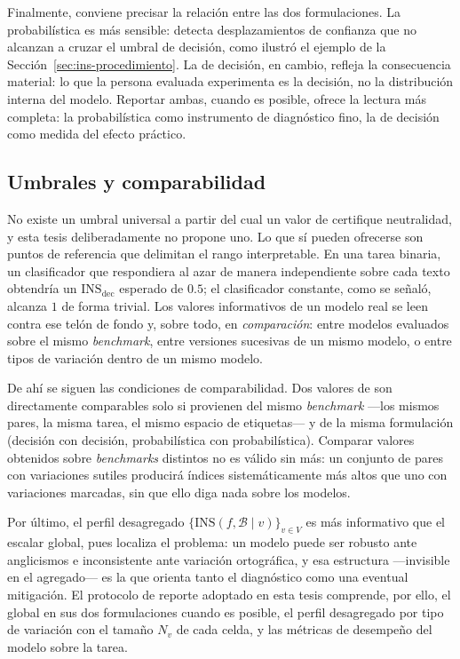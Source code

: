 Finalmente, conviene precisar la relación entre las dos formulaciones. La
probabilística es más sensible: detecta desplazamientos de confianza que no
alcanzan a cruzar el umbral de decisión, como ilustró el ejemplo de la
Sección~\ref{sec:ins-procedimiento}. La de decisión, en cambio, refleja la
consecuencia material: lo que la persona evaluada experimenta es la decisión,
no la distribución interna del modelo. Reportar ambas, cuando es posible,
ofrece la lectura más completa: la probabilística como instrumento de
diagnóstico fino, la de decisión como medida del efecto práctico.

\subsection{Umbrales y comparabilidad}

No existe un umbral universal a partir del cual un valor de \INS certifique
neutralidad, y esta tesis deliberadamente no propone uno. Lo que sí pueden
ofrecerse son puntos de referencia que delimitan el rango interpretable. En
una tarea binaria, un clasificador que respondiera al azar de manera
independiente sobre cada texto obtendría un
$\mathrm{INS}_{\mathrm{dec}}$ esperado de $0.5$; el clasificador constante,
como se señaló, alcanza $1$ de forma trivial. Los valores informativos de un
modelo real se leen contra ese telón de fondo y, sobre todo, en
\emph{comparación}: entre modelos evaluados sobre el mismo \emph{benchmark},
entre versiones sucesivas de un mismo modelo, o entre tipos de variación
dentro de un mismo modelo.

De ahí se siguen las condiciones de comparabilidad. Dos valores de \INS son
directamente comparables solo si provienen del mismo \emph{benchmark} ---los
mismos pares, la misma tarea, el mismo espacio de etiquetas--- y de la misma
formulación (decisión con decisión, probabilística con probabilística).
Comparar valores obtenidos sobre \emph{benchmarks} distintos no es válido sin
más: un conjunto de pares con variaciones sutiles producirá índices
sistemáticamente más altos que uno con variaciones marcadas, sin que ello
diga nada sobre los modelos.

Por último, el perfil desagregado
$\{\mathrm{INS}(f, \mathcal{B} \mid v)\}_{v \in V}$ es más informativo que el
escalar global, pues localiza el problema: un modelo puede ser robusto ante
anglicismos e inconsistente ante variación ortográfica, y esa estructura
---invisible en el agregado--- es la que orienta tanto el diagnóstico como
una eventual mitigación. El protocolo de reporte adoptado en esta tesis
comprende, por ello, el \INS global en sus dos formulaciones cuando es
posible, el perfil desagregado por tipo de variación con el tamaño $N_v$ de
cada celda, y las métricas de desempeño del modelo sobre la tarea.

